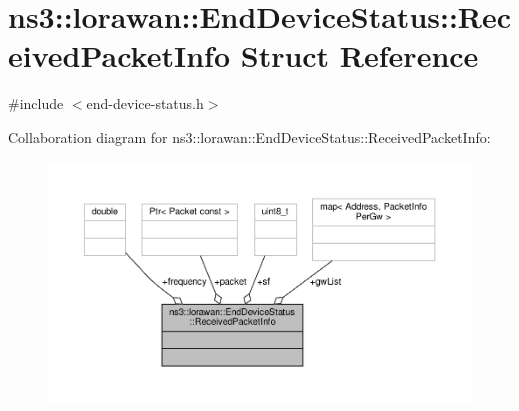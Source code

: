 \hypertarget{structns3_1_1lorawan_1_1EndDeviceStatus_1_1ReceivedPacketInfo}{}\section{ns3\+:\+:lorawan\+:\+:End\+Device\+Status\+:\+:Received\+Packet\+Info Struct Reference}
\label{structns3_1_1lorawan_1_1EndDeviceStatus_1_1ReceivedPacketInfo}


{\ttfamily \#include $<$end-\/device-\/status.\+h$>$}



Collaboration diagram for ns3\+:\+:lorawan\+:\+:End\+Device\+Status\+:\+:Received\+Packet\+Info\+:
\nopagebreak
\begin{figure}[H]
\begin{center}
\leavevmode
\includegraphics[width=350pt]{structns3_1_1lorawan_1_1EndDeviceStatus_1_1ReceivedPacketInfo__coll__graph}
\end{center}
\end{figure}
